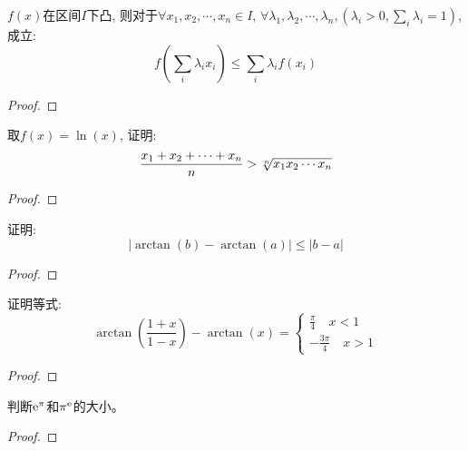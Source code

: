 \begin{theorem}[Jensen不等式]
    $f(x)$在区间$I$下凸, 则对于$\forall x_1, x_2, \cdots, x_n \in I$, $\forall \lambda_1, \lambda_2, \cdots, \lambda_n, (\lambda_i > 0, \sum_i \lambda_i = 1)$, 成立:
    \begin{equation*}
        f(\sum_i\lambda_i x_i) \le \sum_i\lambda_i f(x_i)
    \end{equation*}
\end{theorem}
\begin{proof}
    
\end{proof}

\begin{example}
    取$f(x) = \ln(x)$, 证明:
    \begin{equation*}
        \frac{x_1 + x_2 + \cdots + x_n}{n} > \sqrt[n]{x_1x_2\cdots x_n}
    \end{equation*}
\end{example}
\begin{proof}
    
\end{proof}

\begin{example}
    证明:
    \begin{equation*}
        \left| \arctan(b) - \arctan(a) \right| \le \left| b - a \right|
    \end{equation*}
\end{example}
\begin{proof}
    
\end{proof}

\begin{example}
    证明等式:
    \begin{equation*}
        \arctan\left( \frac{1+x}{1-x} \right) - \arctan(x) = \left\{
            \begin{aligned}
                \frac{\pi}{4} \quad x < 1 \\
                -\frac{3\pi}{4} \quad x > 1
            \end{aligned} \right.
    \end{equation*}
\end{example}
\begin{proof}
    
\end{proof}

\begin{example}
    判断$\mathrm{e}^{\pi}$和$\pi^{\mathrm{e}}$的大小。
\end{example}
\begin{proof}
    
\end{proof}

